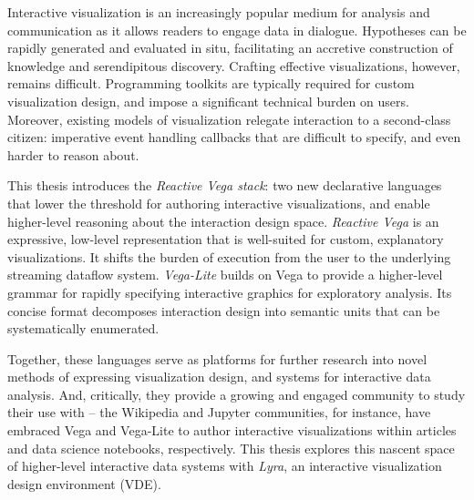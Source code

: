 
Interactive visualization is an increasingly popular medium for analysis and
communication as it allows readers to engage data in dialogue. Hypotheses can be
rapidly generated and evaluated in situ, facilitating an accretive construction
of knowledge and serendipitous discovery. Crafting effective visualizations,
however, remains difficult. Programming toolkits are typically required for
custom visualization design, and impose a significant technical burden on users.
Moreover, existing models of visualization relegate interaction to a
second-class citizen: imperative event handling callbacks that are difficult to
specify, and even harder to reason about.

This thesis introduces the \emph{Reactive Vega stack}: two new declarative
languages that lower the threshold for authoring interactive visualizations, and
enable higher-level reasoning about the interaction design space. \emph{Reactive
Vega} is an expressive, low-level representation that is well-suited for custom,
explanatory visualizations. It shifts the burden of execution from the user to
the underlying streaming dataflow system. \emph{Vega-Lite} builds on Vega to
provide a higher-level grammar for rapidly specifying interactive graphics for
exploratory analysis. Its concise format decomposes interaction design into
semantic units that can be systematically enumerated.

Together, these languages serve as platforms for further research into novel
methods of expressing visualization design, and systems for interactive data
analysis. And, critically, they provide a growing and engaged community to study
their use with -- the Wikipedia and Jupyter communities, for instance, have
embraced Vega and Vega-Lite to author interactive visualizations within articles
and data science notebooks, respectively. This thesis explores this nascent
space of higher-level interactive data systems with \emph{Lyra}, an interactive
visualization design environment (VDE).